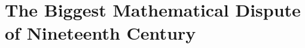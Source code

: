 \documentclass[elemannt.tex]{subfile}
\begin{document}
	\chapter{The Biggest Mathematical Dispute of Nineteenth Century}\label{ch:dispute}
\end{document}
